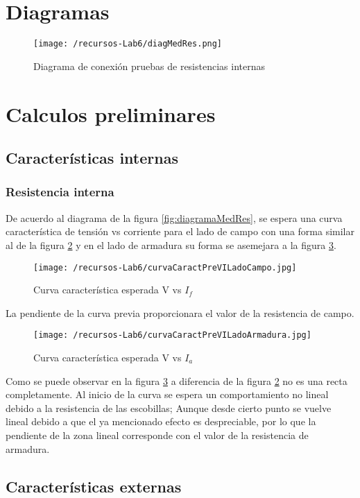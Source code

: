 \documentclass[11pt,letterpaper]{article}     %
\begin{document}
\section{Diagramas}
\begin{figure}[H]
    \centering
    \texttt{[image: /recursos-Lab6/diagMedRes.png]}
    \caption{Diagrama de conexión pruebas de resistencias internas}
    \label{fig:diagMedRes}
\end{figure}
\section{Calculos preliminares}
\subsection{Características internas}
\subsubsection{Resistencia interna }
De acuerdo al diagrama de la figura \ref{fig:diagramaMedRes},  se espera una curva característica de tensión vs corriente para el lado de campo con una forma similar al de la figura \ref{fig:curvaCaractPreVILadoCampo} y en el lado de armadura su forma se asemejara a la figura \ref{fig:curvaCaractPreVILadoArmadura}.
\begin{figure}[H]
    \centering
    \texttt{[image: /recursos-Lab6/curvaCaractPreVILadoCampo.jpg]}
    \caption{Curva característica esperada V vs $I_{f}$}
    \label{fig:curvaCaractPreVILadoCampo}
\end{figure}
La pendiente de la curva previa proporcionara el valor de la resistencia de campo.
\begin{figure}[H]
    \centering
    \texttt{[image: /recursos-Lab6/curvaCaractPreVILadoArmadura.jpg]}
    \caption{Curva característica esperada V vs $I_{a}$}
    \label{fig:curvaCaractPreVILadoArmadura}
\end{figure} 
Como se puede observar en la figura \ref{fig:curvaCaractPreVILadoArmadura} a diferencia de la figura \ref{fig:curvaCaractPreVILadoCampo} no es una recta completamente. Al inicio de la curva se espera un comportamiento no lineal debido a la resistencia de las escobillas; Aunque desde cierto punto se vuelve lineal debido a que el ya mencionado efecto es despreciable, por lo que la pendiente de la zona lineal corresponde con el valor de la resistencia de armadura. 
\subsection{Características externas}
\end{document}
